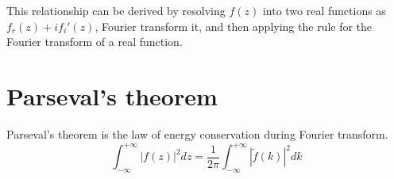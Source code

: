 \documentclass{article}[10pt,a4paper]
\newcommand{\intinfty}{\int^{+\infty}_{-\infty}\xspace}
\newcommand{\abs}[1]{\left|{#1}\right|\xspace}
\begin{document}
This relationship can be derived by resolving $f(z)$ into two real
functions as $f_r(z) + i f_i'(z)$, Fourier transform it, and then
applying the rule for the Fourier transform of a real function.

\section{Parseval's theorem}
Parseval's theorem is the law of energy conservation during Fourier
transform.
\begin{equation}
 \intinfty \abs{f(z)}^2 dz = \frac{1}{2\pi}
  \intinfty{\abs{\tilde{f}(k)}^2} dk
\end{equation}


\end{document}
